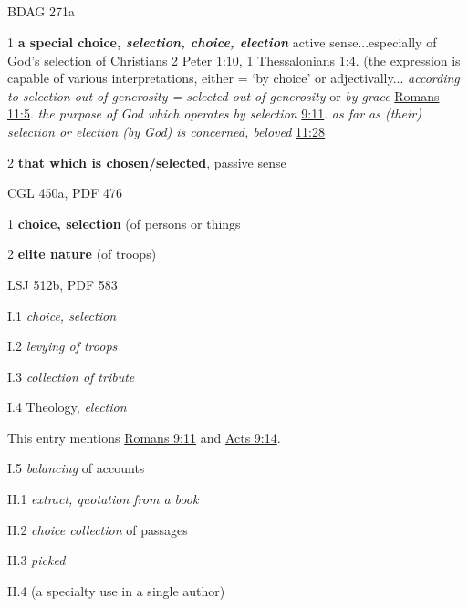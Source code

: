 		
			\subparagraph{\texorpdfstring{}{}}
				\label{EKLOGE}
			
				\begin{compactdesc}
					\item[BDAG 271a] \textbf{}
						\begin{compactitem}
							\item[1] \textbf{a special choice, \textit{selection, choice, election}} active sense...especially of God's selection of Christians \hyperref[2PETER-1-10]{2 Peter 1:10}, \hyperref[1THESSALONIANS-1-4]{1 Thessalonians 1:4}.  (the expression is capable of various interpretations, either = `by choice' or adjectivally... \textit{according to selection out of generosity = selected out of generosity} or \textit{by grace} \hyperref[ROMANS-11-5]{Romans 11:5}.  \textit{the purpose of God which operates by selection} \hyperref[ROMANS-9-11]{9:11}.  \textit{as far as (their) selection or election (by God) is concerned, beloved} \hyperref[ROMANS-11-28]{11:28} 
							\item[2] \textbf{that which is chosen/selected}, passive sense
						\end{compactitem}
					\item[CGL 450a, PDF 476] \textbf{}
						\begin{compactitem}
							\item[1] \textbf{choice, selection} (of persons or things
							\item[2] \textbf{elite nature} (of troops)
						\end{compactitem}
					\item[LSJ 512b, PDF 583] \textbf{}
						\begin{compactitem}
							\item[I.1] \textit{choice, selection}
							\item[I.2] \textit{levying of troops}
							\item[I.3] \textit{collection of tribute}
							\item[I.4] Theology, \textit{election}
								\begin{compactitem}
									\item This entry mentions \hyperref[ROMANS-9-11]{Romans 9:11} and \hyperref[ACTS-9-15]{Acts 9:14}.
								\end{compactitem}
							\item[I.5] \textit{balancing} of accounts
							\item[II.1] \textit{extract, quotation from a book}
							\item[II.2] \textit{choice collection} of passages
							\item[II.3] \textit{picked} 
							\item[II.4] (a specialty use in a single author)
						\end{compactitem}
				\end{compactdesc}
				
